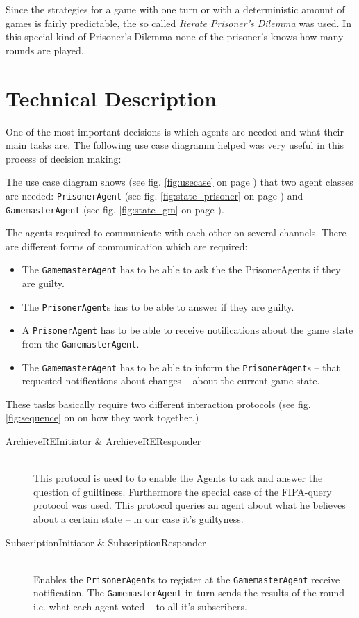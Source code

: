 \documentclass[a4paper,12pt]{article}
\begin{document}
Since the strategies for a game with one turn or with a deterministic amount of games is fairly predictable,
the so called \textit{Iterate Prisoner's Dilemma} was used.
In this special kind of Prisoner's Dilemma none of the prisoner's knows how many rounds are played.

\section{Technical Description}

One of the most important decisions is which agents are needed and what their main tasks are.
The following use case diagramm helped was very useful in this process of decision making:

The use case diagram shows (see fig. \ref{fig:usecase} on page \pageref{fig:usecase}) that two agent classes are needed:
\texttt{PrisonerAgent} (see fig. \ref{fig:state_prisoner} on page \pageref{fig:state_prisoner}) and \texttt{GamemasterAgent} (see fig. \ref{fig:state_gm} on page \pageref{fig:state_gm}).

The agents required to communicate with each other on several channels.
There are different forms of communication which are required:

\begin{itemize}
	\item The \texttt{GamemasterAgent} has to be able to ask the the PrisonerAgents if they are guilty.
	\item The \texttt{PrisonerAgent}s has to be able to answer if they are guilty.
	\item A \texttt{PrisonerAgent} has to be able to receive notifications about the game state from the \texttt{GamemasterAgent}.
	\item The \texttt{GamemasterAgent} has to be able to inform the \texttt{PrisonerAgent}s
		-- that requested notifications about changes -- about the current game state.
\end{itemize}

These tasks basically require two different interaction protocols (see fig. \ref{fig:sequence} on \pageref{fig:sequence} on how they work together.)

\begin{description}
	\item[ArchieveREInitiator \& ArchieveREResponder]\hfill \\
	 	This protocol is used to to enable the Agents to ask and answer the question of guiltiness.
		Furthermore the special case of the FIPA-query protocol was used.
		This protocol queries an agent about what he believes about a certain state -- in our case it's guiltyness.
	\item[SubscriptionInitiator \& SubscriptionResponder] \hfill \\
		Enables the \texttt{PrisonerAgent}s to register at the \texttt{GamemasterAgent} receive notification.
		The \texttt{GamemasterAgent} in turn sends the results of the round -- i.e. what each agent voted -- to all it's subscribers.
\end{description}
\end{document}
